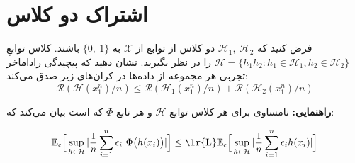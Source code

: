 \section{اشتراک دو کلاس}
فرض کنید که 
$\mathcal{H}_1, \ \mathcal{H}_2$
دو کلاس از توابع  از 
$\mathcal{X}$
به 
$\{0, \ 1\}$
باشند.
کلاس توابعِ
$\mathcal{H}= \{h_1 h_2: h_1 \in \mathcal{H}_1, h_2 \in \mathcal{H}_2 \}$
را در نظر بگیرید. نشان دهید که پیچیدگی راداماخر تجربی هر مجموعه از داده‌ها در کران‌های زیر صدق می‌کند:
$$\mathcal{R}(\mathcal{H}(x_1^n)/n) \leq \mathcal{R}(\mathcal{H}_1(x_1^n)/n) + \mathcal{R}(\mathcal{H}_2(x_1^n)/n)$$ 

\textbf{راهنمایی:}
 نامساوی 
برای هر کلاس توابع $\mathcal{H}$
و هر تابع $\Phi$ 
که 
است بیان می‌کند که:

$$\mathbb{E}_\epsilon \Big[\sup_{h \in \mathcal{H}}|\frac{1}{n} \sum_{i=1}^n \epsilon_i \ \Phi  \big(h(x_i)\big)|\Big] \leq \text{\lr{L}} \mathbb{E}_\epsilon \Big[\sup_{h \in \mathcal{H}}|\frac{1}{n} \sum_{i=1}^n \epsilon_i h(x_i)| \Big]$$